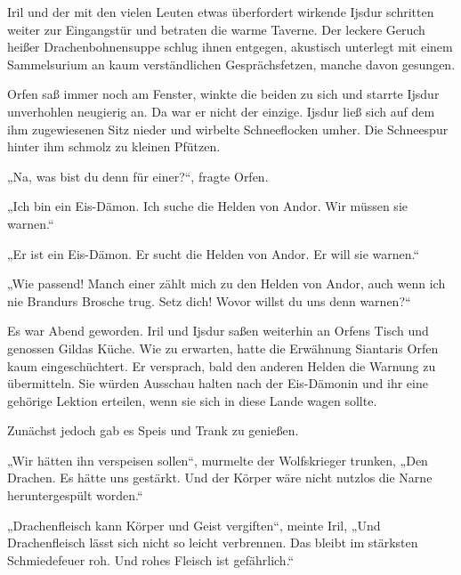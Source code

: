 Iril und der mit den vielen Leuten etwas überfordert wirkende Ijsdur schritten weiter zur Eingangstür und betraten die warme Taverne. Der leckere Geruch heißer Drachenbohnensuppe schlug ihnen entgegen, akustisch unterlegt mit einem Sammelsurium an kaum verständlichen Gesprächsfetzen, manche davon gesungen. 


Orfen saß immer noch am Fenster, winkte die beiden zu sich und starrte Ijsdur unverhohlen neugierig an. Da war er nicht der einzige. Ijsdur ließ sich auf dem ihm zugewiesenen Sitz nieder und wirbelte Schneeflocken umher. Die Schneespur hinter ihm schmolz zu kleinen Pfützen.

„Na, was bist du denn für einer?“, fragte Orfen.

„Ich bin ein Eis-Dämon. Ich suche die Helden von Andor. Wir müssen sie warnen.“

„Er ist ein Eis-Dämon. Er sucht die Helden von Andor. Er will sie warnen.“

„Wie passend! Manch einer zählt mich zu den Helden von Andor, auch wenn ich nie Brandurs Brosche trug. Setz dich! Wovor willst du uns denn warnen?“



\trennzeichen



Es war Abend geworden. Iril und Ijsdur saßen weiterhin an Orfens Tisch und genossen Gildas Küche. Wie zu erwarten, hatte die Erwähnung Siantaris Orfen kaum eingeschüchtert. Er versprach, bald den anderen Helden die Warnung zu übermitteln. Sie würden Ausschau halten nach der Eis-Dämonin und ihr eine gehörige Lektion erteilen, wenn sie sich in diese Lande wagen sollte.

Zunächst jedoch gab es Speis und Trank zu genießen.

„Wir hätten ihn verspeisen sollen“, murmelte der Wolfskrieger trunken, „Den Drachen. Es hätte uns gestärkt. Und der Körper wäre nicht nutzlos die Narne heruntergespült worden.“

„Drachenfleisch kann Körper und Geist vergiften“, meinte Iril, „Und Drachenfleisch lässt sich nicht so leicht verbrennen. Das bleibt im stärksten Schmiedefeuer roh. Und rohes Fleisch ist gefährlich.“

